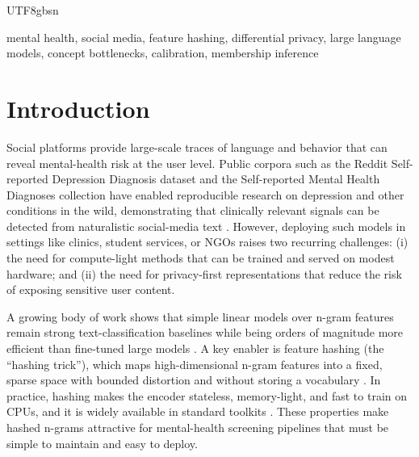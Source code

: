 \documentclass[lettersize,journal]{IEEEtran}
\begin{document}
\begin{CJK*}{UTF8}{gbsn}
\begin{IEEEkeywords}
mental health, social media, feature hashing, differential privacy, large language models, concept bottlenecks, calibration, membership inference
\end{IEEEkeywords}




\section{Introduction}
Social platforms provide large-scale traces of language and behavior that can reveal mental-health risk at the user level. Public corpora such as the Reddit Self-reported Depression Diagnosis dataset and the Self-reported Mental Health Diagnoses collection have enabled reproducible research on depression and other conditions in the wild, demonstrating that clinically relevant signals can be detected from naturalistic social-media text \cite{yates2017rsdd,cohan2018smhd}. However, deploying such models in settings like clinics, student services, or NGOs raises two recurring challenges: (i) the need for compute-light methods that can be trained and served on modest hardware; and (ii) the need for privacy-first representations that reduce the risk of exposing sensitive user content.

A growing body of work shows that simple linear models over n\mbox{-}gram features remain strong text-classification baselines while being orders of magnitude more efficient than fine-tuned large models \cite{joulin2017bag}. A key enabler is feature hashing (the ``hashing trick''), which maps high-dimensional n\mbox{-}gram features into a fixed, sparse space with bounded distortion and without storing a vocabulary \cite{weinberger2009featurehashing}. In practice, hashing makes the encoder stateless, memory-light, and fast to train on CPUs, and it is widely available in standard toolkits \cite{scikit2025hashingvectorizer}. These properties make hashed n\mbox{-}grams attractive for mental-health screening pipelines that must be simple to maintain and easy to deploy.


\end{CJK*}
\end{document}

